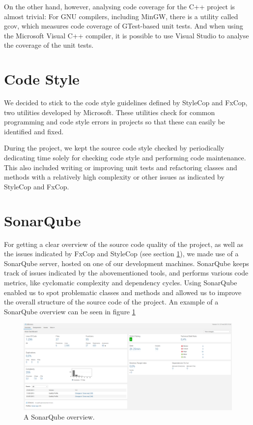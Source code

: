             On the other hand, however, analysing code coverage for the C++ 
            project is almost trivial: For GNU compilers, including MinGW, 
            there is a utility called gcov, which measures code coverage of 
            GTest-based unit tests. And when using the Microsoft Visual C++ 
            compiler, it is possible to use Visual Studio to analyse the 
            coverage of the unit tests.
			
	\section{Code Style} \label{sec:codestyle}
		We decided to stick to the code style guidelines defined by StyleCop and 
		FxCop, two utilities developed by Microsoft. These utilities check for 
		common programming and code style errors in projects so that these can 
		easily be identified and fixed. 
		
		During the project, we kept the source code style checked by periodically
		dedicating time solely for checking code style and performing code 
		maintenance. This also included writing or improving unit tests and 
		refactoring classes and methods with a relatively high complexity or other 
		issues as indicated by StyleCop and FxCop.
		
	\section{SonarQube} \label{sec:sonarqube}
		For getting a clear overview of the source code quality of the project, as 
		well as the issues indicated by FxCop and StyleCop (see section 
		\ref{sec:codestyle}), we made use of a SonarQube server, hosted on one of 
		our development machines. SonarQube keeps track of issues indicated by 
		the abovementioned tools, and performs various code metrics, like cyclomatic 
		complexity and dependency cycles. Using SonarQube enabled us to spot 
		problematic classes and methods and allowed us to improve the overall 
		structure of the source code of the project. An example of a SonarQube
		overview can be seen in figure \ref{fig:sonarqube}
		
		\begin{figure}[!ht]
			\centering
			\includegraphics[width=\textwidth]{SonarQube}
			\caption{A SonarQube overview.}
			\label{fig:sonarqube}
		\end{figure}
		
